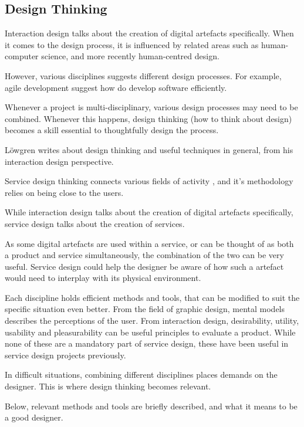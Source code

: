 \subsection{Design Thinking}

%

Interaction design talks about the creation of digital artefacts specifically. When it comes to the design process, it is influenced by related areas such as human-computer science, and more recently human-centred design.

However, various disciplines suggests different design processes. For example, agile development suggest how do develop software efficiently.

Whenever a project is multi-disciplinary, various design processes may need to be combined. Whenever this happens, design thinking (how to think about design) becomes a skill essential to thoughtfully design the process.

Löwgren \cite{lowgren} writes about design thinking and useful techniques in general, from his interaction design perspective.

Service design thinking connects various fields of activity \cite{stickdorn}, and it's methodology relies on being close to the users.

While interaction design talks about the creation of digital artefacts specifically, service design talks about the creation of services.

As some digital artefacts are used within a service, or can be thought of as both a product and service simultaneously, the combination of the two can be very useful. Service design could help the designer be aware of how such a artefact would need to interplay with its physical environment.

Each discipline holds efficient methods and tools, that can be modified to suit the specific situation even better. From the field of graphic design, mental models describes the perceptions of the user. From interaction design, desirability, utility, usability and pleasurability can be useful principles to evaluate a product. While none of these are a mandatory part of service design, these have been useful in service design projects previously. \cite{stickdorn}

In difficult situations, combining different disciplines places demands on the designer. This is where design thinking becomes relevant.

Below, relevant methods and tools are briefly described, and what it means to be a good designer.

